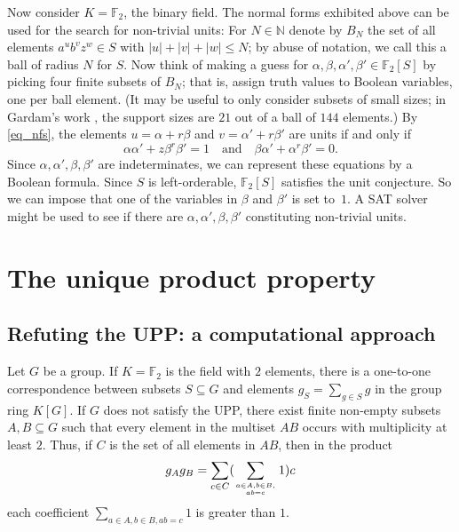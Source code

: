 \documentclass[11pt]{amsart}
\theoremstyle{mythm}
\theoremstyle{mydef}
\theoremstyle{myrem}
\numberwithin{equation}{section}
\begin{document}
Now consider $K=\mathbb{F}_2$, the binary field. The normal forms exhibited above can be used for the  search for non-trivial units: For $N\in\mathbb N$ denote by $B_N$ the set of all elements  $a^ub^vz^w\in S$ with $|u|+ |v| + |w| \le N$; by abuse of notation, we call this a ball of radius $N$ for $S$.  Now  think of making  a guess for  $\alpha,\beta,\alpha',\beta'\in \mathbb{F}_2[S]$ by picking four finite subsets of $B_N$; that is, assign truth values to Boolean variables,  one per ball element. (It may be useful to only consider subsets of small sizes; in Gardam's work \cite{G}, the support sizes are $21$ out of a ball of $144$ elements.) By \eqref{eq_nfs}, the elements $u=\alpha+r\beta$ and $v=\alpha'+r\beta'$ are units if and only if 
\[\alpha\alpha' + z \beta^r\beta'=1\quad\text{and}\quad \beta\alpha' + \alpha^r\beta'=0.\]
Since $\alpha,\alpha',\beta,\beta'$ are indeterminates, we can represent these equations by a Boolean formula. Since $S$ is left-orderable, $\mathbb{F}_2[S]$ satisfies the unit conjecture. So we can impose that one  of the variables in $\beta$ and $\beta'$ is set to~$1$. A SAT solver might be used    to  see if there are  $\alpha,\alpha',\beta,\beta'$ constituting non-trivial units. %
 


 \section{The unique product property}

\subsection{Refuting the   UPP: a computational approach}\label{sec_comp}

\noindent Let $G$ be a group. If  $K=\mathbb{F}_2$ is the field with $2$ elements, there is a one-to-one correspondence between subsets $S\subseteq G$ and elements $g_S = \sum_{g\in S} g$ in the group ring $K[G]$. If $G$ does not  satisfy the UPP,  there exist finite non-empty subsets $A,B\subseteq G$ such that every element in the multiset $AB$ occurs with multiplicity at least $2$. Thus, if $C$ is the set of all elements in $AB$, then in the product 
\[g_A g_B = \sum_{c\in C} (\sum_{a\in A, b\in B, \atop ab=c} 1) c\]
each  coefficient $\sum_{a\in A, b\in B, ab=c} 1$ is greater than $1$.
\end{document}
